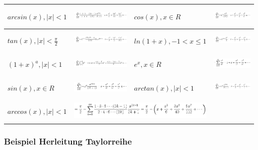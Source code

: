 \begin{tabular}{|l|l|l|l|}
\hline 
$arcsin(x),|x|<1$ & \includegraphics[height=1cm]{potenzreihen/img18} & $cos(x),x\in R$ & \includegraphics[height=1cm]{potenzreihen/img13}\tabularnewline
\hline 
$tan(x),|x|<\frac{\pi}{2}$ & \includegraphics[height=1cm]{potenzreihen/img15} & $ln(1+x),-1<x\leq1$ & \includegraphics[height=1cm]{potenzreihen/img8}\tabularnewline
\hline 
$(1+x)^{a},|x|<1$ & \includegraphics[height=1cm]{potenzreihen/img2} & $e^{x},x\in R$ & \includegraphics[height=1cm]{potenzreihen/img5}\tabularnewline
\hline 
$sin(x),x\in R$ & \includegraphics[height=1cm]{potenzreihen/img11} & $arctan(x),|x|<1$ & \includegraphics[height=1cm]{potenzreihen/img22}\tabularnewline
\hline 
$arccos(x),|x|<1^ {}$ & \multicolumn{2}{l|}{\includegraphics[height=1cm]{potenzreihen/img20}} & \tabularnewline
\hline 
\end{tabular}


\subsubsection*{Beispiel Herleitung Taylorreihe}


